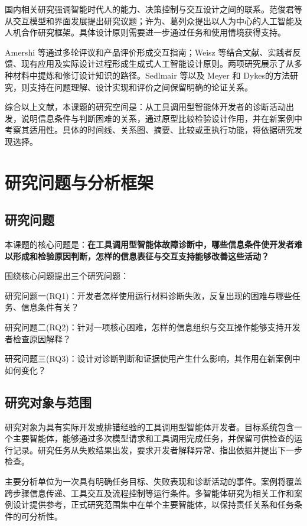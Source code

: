 国内相关研究强调智能时代人的能力、决策控制与交互设计之间的联系。范俊君等\cite{ref42}从交互模型和界面发展提出研究议题；许为、葛列众\cite{ref63}提出以人为中心的人工智能及人机合作研究框架。具体设计原则需要进一步通过任务和使用情境获得支持。

Amershi 等\cite{ref48}通过多轮评议和产品评价形成交互指南；Weisz 等\cite{ref66}结合文献、实践者反馈、现有应用及实际设计过程形成生成式人工智能设计原则。两项研究展示了从多种材料中提炼和修订设计知识的路径。Sedlmair 等\cite{sedlmair2012design}以及 Meyer 和 Dykes\cite{meyer2020rigor}的方法研究，则支持在问题理解、设计实现和评价之间保留明确的论证关系。

综合以上文献，本课题的研究空间是：从工具调用型智能体开发者的诊断活动出发，说明信息条件与判断困难的关系，通过原型比较检验设计作用，并在新案例中考察其适用性。具体的时间线、关系图、摘要、比较或重执行功能，将依据研究发现选择。

\section{研究问题与分析框架}

\subsection{研究问题}

本课题的核心问题是：\textbf{在工具调用型智能体故障诊断中，哪些信息条件使开发者难以形成和检验原因判断，怎样的信息表征与交互支持能够改善这些活动？}

围绕核心问题提出三个研究问题：

研究问题一(RQ1)：开发者怎样使用运行材料诊断失败，反复出现的困难与哪些任务、信息条件有关？

研究问题二(RQ2)：针对一项核心困难，怎样的信息组织与交互操作能够支持开发者检查原因解释？

研究问题三(RQ3)：设计对诊断判断和证据使用产生什么影响，其作用在新案例中如何变化？

\subsection{研究对象与范围}

研究对象为具有实际开发或排错经验的工具调用型智能体开发者。目标系统包含一个主要智能体，能够通过多次模型请求和工具调用完成任务，并保留可供检查的运行记录。研究任务从失败结果出发，要求开发者解释异常、指出依据并提出下一步检查。

主要分析单位为一次具有明确任务目标、失败表现和诊断活动的事件。案例将覆盖跨步骤信息传递、工具交互及流程控制等运行条件。多智能体研究为相关工作和案例设计提供参考，正式研究范围集中在单个主要智能体，以保持责任关系和任务条件的可分析性。

